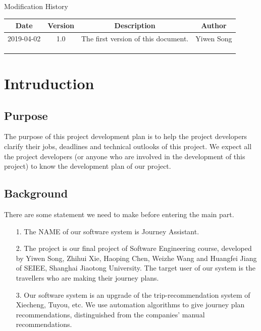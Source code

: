 \documentclass[10pt]{article}
\begin{document}
\newpage

\begin{center}
    {\LARGE Modification History}
    
    \begin{tabular}{|c|c|c|c|} 
        \hline 
        Date&Version&Description&Author\\
        \hline  
        2019-04-02&1.0&The first version of this document.&Yiwen Song\\
		\hline 
		 & & & \\
		\hline
		& & & \\
		\hline
		& & & \\
		\hline
    \end{tabular}    
\end{center}

\newpage

\tableofcontents
\newpage

\section{Intruduction}
\subsection{Purpose}
The purpose of this project development plan is to help the project developers clarify their jobs, deadlines and technical outlooks of this project. We expect all the project developers (or anyone who are involved in the development of this project) to know the development plan of our project.

\subsection{Background}
There are some statement we need to make before entering the main part.

\begin{itemize}
	\item[1.] The NAME of our software system is Journey Assistant.
	\item[2.] The project is our final project of Software Engineering course, developed by Yiwen Song, Zhihui Xie, Haoping Chen, Weizhe Wang and Huangfei Jiang of SEIEE, Shanghai Jiaotong University. The target user of our system is the travellers who are making their journey plans. 
	\item[3.] Our software system is an upgrade of the trip-recommendation system of Xiecheng, Tuyou, etc. We use automation algorithms to give journey plan recommendations, distinguished from the companies' manual recommendations.
\end{itemize}
\end{document}
